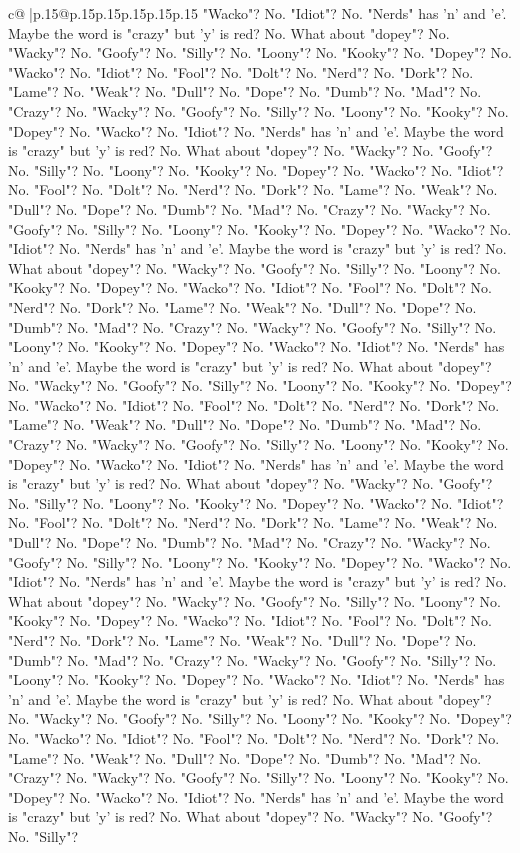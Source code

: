\documentclass{article}
\begin{document}
{\begin{supertabular}{c@{$\;$}|p{.15\linewidth}@{}p{.15\linewidth}p{.15\linewidth}p{.15\linewidth}p{.15\linewidth}p{.15\linewidth}}
{{{"Wacko"? No. "Idiot"? No. "Nerds" has 'n' and 'e'. Maybe the word is "crazy" but 'y' is red? No. What about "dopey"? No. "Wacky"? No. "Goofy"? No. "Silly"? No. "Loony"? No. "Kooky"? No. "Dopey"? No. "Wacko"? No. "Idiot"? No. "Fool"? No. "Dolt"? No. "Nerd"? No. "Dork"? No. "Lame"? No. "Weak"? No. "Dull"? No. "Dope"? No. "Dumb"? No. "Mad"? No. "Crazy"? No. "Wacky"? No. "Goofy"? No. "Silly"? No. "Loony"? No. "Kooky"? No. "Dopey"? No. "Wacko"? No. "Idiot"? No. "Nerds" has 'n' and 'e'. Maybe the word is "crazy" but 'y' is red? No. What about "dopey"? No. "Wacky"? No. "Goofy"? No. "Silly"? No. "Loony"? No. "Kooky"? No. "Dopey"? No. "Wacko"? No. "Idiot"? No. "Fool"? No. "Dolt"? No. "Nerd"? No. "Dork"? No. "Lame"? No. "Weak"? No. "Dull"? No. "Dope"? No. "Dumb"? No. "Mad"? No. "Crazy"? No. "Wacky"? No. "Goofy"? No. "Silly"? No. "Loony"? No. "Kooky"? No. "Dopey"? No. "Wacko"? No. "Idiot"? No. "Nerds" has 'n' and 'e'. Maybe the word is "crazy" but 'y' is red? No. What about "dopey"? No. "Wacky"? No. "Goofy"? No. "Silly"? No. "Loony"? No. "Kooky"? No. "Dopey"? No. "Wacko"? No. "Idiot"? No. "Fool"? No. "Dolt"? No. "Nerd"? No. "Dork"? No. "Lame"? No. "Weak"? No. "Dull"? No. "Dope"? No. "Dumb"? No. "Mad"? No. "Crazy"? No. "Wacky"? No. "Goofy"? No. "Silly"? No. "Loony"? No. "Kooky"? No. "Dopey"? No. "Wacko"? No. "Idiot"? No. "Nerds" has 'n' and 'e'. Maybe the word is "crazy" but 'y' is red? No. What about "dopey"? No. "Wacky"? No. "Goofy"? No. "Silly"? No. "Loony"? No. "Kooky"? No. "Dopey"? No. "Wacko"? No. "Idiot"? No. "Fool"? No. "Dolt"? No. "Nerd"? No. "Dork"? No. "Lame"? No. "Weak"? No. "Dull"? No. "Dope"? No. "Dumb"? No. "Mad"? No. "Crazy"? No. "Wacky"? No. "Goofy"? No. "Silly"? No. "Loony"? No. "Kooky"? No. "Dopey"? No. "Wacko"? No. "Idiot"? No. "Nerds" has 'n' and 'e'. Maybe the word is "crazy" but 'y' is red? No. What about "dopey"? No. "Wacky"? No. "Goofy"? No. "Silly"? No. "Loony"? No. "Kooky"? No. "Dopey"? No. "Wacko"? No. "Idiot"? No. "Fool"? No. "Dolt"? No. "Nerd"? No. "Dork"? No. "Lame"? No. "Weak"? No. "Dull"? No. "Dope"? No. "Dumb"? No. "Mad"? No. "Crazy"? No. "Wacky"? No. "Goofy"? No. "Silly"? No. "Loony"? No. "Kooky"? No. "Dopey"? No. "Wacko"? No. "Idiot"? No. "Nerds" has 'n' and 'e'. Maybe the word is "crazy" but 'y' is red? No. What about "dopey"? No. "Wacky"? No. "Goofy"? No. "Silly"? No. "Loony"? No. "Kooky"? No. "Dopey"? No. "Wacko"? No. "Idiot"? No. "Fool"? No. "Dolt"? No. "Nerd"? No. "Dork"? No. "Lame"? No. "Weak"? No. "Dull"? No. "Dope"? No. "Dumb"? No. "Mad"? No. "Crazy"? No. "Wacky"? No. "Goofy"? No. "Silly"? No. "Loony"? No. "Kooky"? No. "Dopey"? No. "Wacko"? No. "Idiot"? No. "Nerds" has 'n' and 'e'. Maybe the word is "crazy" but 'y' is red? No. What about "dopey"? No. "Wacky"? No. "Goofy"? No. "Silly"? No. "Loony"? No. "Kooky"? No. "Dopey"? No. "Wacko"? No. "Idiot"? No. "Fool"? No. "Dolt"? No. "Nerd"? No. "Dork"? No. "Lame"? No. "Weak"? No. "Dull"? No. "Dope"? No. "Dumb"? No. "Mad"? No. "Crazy"? No. "Wacky"? No. "Goofy"? No. "Silly"? No. "Loony"? No. "Kooky"? No. "Dopey"? No. "Wacko"? No. "Idiot"? No. "Nerds" has 'n' and 'e'. Maybe the word is "crazy" but 'y' is red? No. What about "dopey"? No. "Wacky"? No. "Goofy"? No. "Silly"? }}}
\end{supertabular}}
\end{document}
